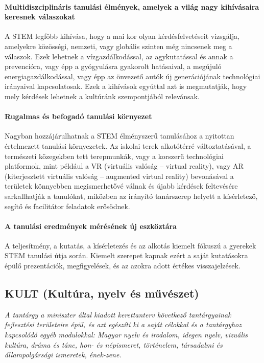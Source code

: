 \paragraph{Multidiszciplináris tanulási élmények, amelyek a világ nagy kihívásaira keresnek válaszokat} A STEM legfőbb kihívása, hogy a mai kor olyan kérdésfelvetéseit vizsgálja, amelyekre közösségi, nemzeti, vagy globális szinten még nincsenek meg a válaszok. Ezek lehetnek a vízgazdálkodással, az agykutatással és annak a prevencióra, vagy épp a gyógyulásra gyakorolt hatásaival, a megújuló energiagazdálkodással, vagy épp az önvezető autók új generációjának technológiai irányaival kapcsolatosak. Ezek a kihívások egyúttal azt is megmutatják, hogy mely kérdések lehetnek a kultúránk szempontjából relevánsak.

\paragraph{Rugalmas és befogadó tanulási környezet} Nagyban hozzájárulhatnak a STEM élményszerű tanulásához a nyitottan értelmezett tanulási környezetek. Az iskolai terek alkotótérré változtatásával, a természeti közegekben tett terepmunkák, vagy a korszerű technológiai platformok, mint például a VR (virtuális valóság – virtual reality), vagy AR (kiterjesztett virtuális valóság – augmented virtual reality) bevonásával a területek könnyebben megismerhetővé válnak és újabb kérdések feltevésére sarkallhatják a tanulókat, miközben az irányító tanárszerep helyett a kísérletező, segítő és facilitátor feladatok erősödnek.


\paragraph{A tanulási eredmények mérésének új eszköztára} A teljesítmény, a kutatás, a kísérletezés és az alkotás kiemelt fókuszú a gyerekek STEM tanulási útja során. Kiemelt szerepet kapnak ezért a saját kutatásokra épülő prezentációk, megfigyelések, és az azokra adott értékes visszajelzések.

\subsection[KULT]{KULT (Kultúra, nyelv és művészet)}
\emph{A tantárgy a miniszter által kiadott kerettanterv következő tantárgyainak fejlesztési területeire épül, és azt egészíti ki a saját célokkal és a tantárgyhoz kapcsolódó egyéb modulokkal: Magyar nyelv és irodalom, idegen nyelv, vizuális kultúra, dráma és tánc, hon- és népismeret, történelem, társadalmi és állampolgársági ismeretek, ének-zene.}

